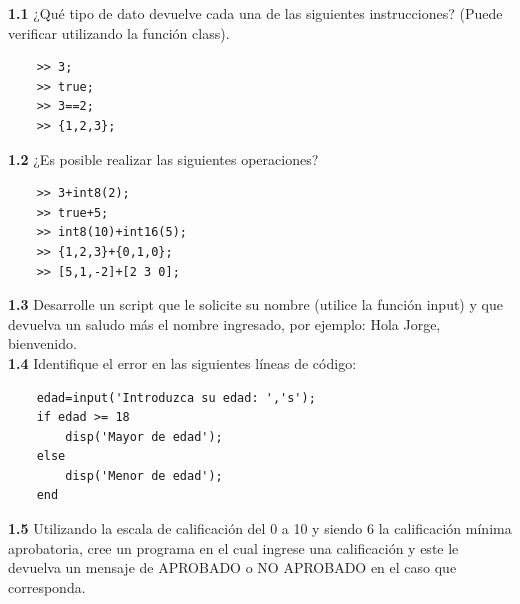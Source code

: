\textbf{1.1} ¿Qué tipo de dato devuelve cada una de las siguientes instrucciones? 
(Puede verificar utilizando la función class).

\begin{verbatim}
	>> 3;
	>> true;
	>> 3==2;
	>> {1,2,3}; 
\end{verbatim}

\textbf{1.2} ¿Es posible realizar las siguientes operaciones?

\begin{verbatim}
	>> 3+int8(2);
	>> true+5;
	>> int8(10)+int16(5);
	>> {1,2,3}+{0,1,0};
	>> [5,1,-2]+[2 3 0];
\end{verbatim}

\textbf{1.3} Desarrolle un script que le solicite su nombre (utilice la función input) 
y que devuelva un saludo más el nombre ingresado, por ejemplo: Hola Jorge, bienvenido.\\

\textbf{1.4} Identifique el error en las siguientes líneas de código:

\begin{verbatim}
	edad=input('Introduzca su edad: ','s');
	if edad >= 18
	    disp('Mayor de edad');
	else
	    disp('Menor de edad');
	end
\end{verbatim}

\textbf{1.5} Utilizando la escala de calificación del 0 a 10 y siendo 6 la calificación 
mínima aprobatoria, cree un programa en el cual ingrese una calificación y este le 
devuelva un mensaje de APROBADO o NO APROBADO en el caso que corresponda.
